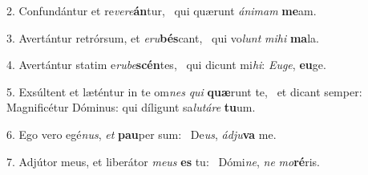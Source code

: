 2. Confundántur et re\textit{ve}\textit{re}\textbf{án}tur, \ast\  qui quærunt \textit{á}\textit{ni}\textit{mam} \textbf{me}am.\

3. Avertántur retrórsum, et \textit{e}\textit{ru}\textbf{bés}cant, \ast\  qui vo\textit{lunt} \textit{mi}\textit{hi} \textbf{ma}la.\

4. Avertántur statim e\textit{ru}\textit{be}\textbf{scén}tes, \ast\  qui dicunt mi\textit{hi}: \textit{Eu}\textit{ge}, \textbf{eu}ge.\

5. Exsúltent et læténtur in te om\textit{nes} \textit{qui} \textbf{quæ}runt te, \ast\  et dicant semper: Magnificétur Dóminus: qui díligunt sa\textit{lu}\textit{tá}\textit{re} \textbf{tu}um.\

6. Ego vero egé\textit{nus}, \textit{et} \textbf{pau}per sum: \ast\  De\textit{us}, \textit{ád}\textit{ju}\textbf{va} me.\

7. Adjútor meus, et liberátor \textit{me}\textit{us} \textbf{es} tu: \ast\  Dómi\textit{ne}, \textit{ne} \textit{mo}\textbf{ré}ris.\

